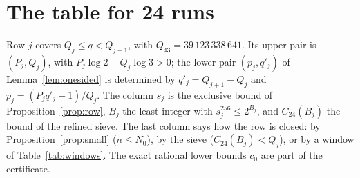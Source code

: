 \documentclass[11pt]{amsart}
\theoremstyle{definition}
\theoremstyle{remark}
\begin{document}
\appendix

\section{The table for 24 runs}\label{app:table}

Row $j$ covers $Q_j\le q<Q_{j+1}$, with $Q_{43}=39\,123\,338\,641$. Its upper pair is $(P_j,Q_j)$, with $P_j\log2-Q_j\log3>0$; the lower pair $(p_j,q'_j)$ of Lemma~\ref{lem:onesided} is determined by $q'_j=Q_{j+1}-Q_j$ and $p_j=(P_jq'_j-1)/Q_j$. The column $s_j$ is the exclusive bound of Proposition~\ref{prop:row}, $B_j$ the least integer with $s_j^{256}\le2^{B_j}$, and $C_{24}(B_j)$ the bound of the refined sieve. The last column says how the row is closed: by Proposition~\ref{prop:small} ($n\le N_0$), by the sieve ($C_{24}(B_j)<Q_j$), or by a window of Table~\ref{tab:windows}. The exact rational lower bounds $c_0$ are part of the certificate.
\end{document}
